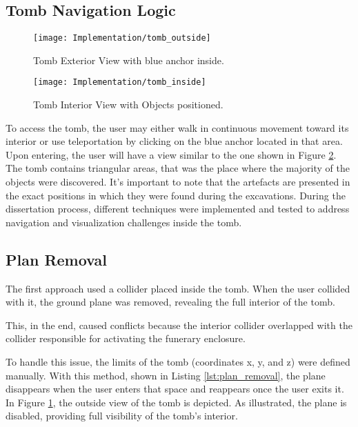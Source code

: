 \subsection{Tomb Navigation Logic}
\label{sec:tomb_logic}

 \begin{figure}[h!]
    \centering
    \texttt{[image: Implementation/tomb\_outside]}
    \caption{Tomb Exterior View with blue anchor inside.}
    \label{fig:tomb_outside}    
\end{figure}

 \begin{figure}[h!]
    \centering
    \texttt{[image: Implementation/tomb\_inside]}
    \caption{Tomb Interior View with Objects positioned.}
    \label{fig:tomb_inside}    
\end{figure}

To access the tomb, the user may either walk in continuous movement toward its interior or use teleportation by clicking on the blue anchor located in that area.
Upon entering, the user will have a view similar to the one shown in Figure \ref{fig:tomb_inside}.
The tomb contains triangular areas, that was the place where the majority of the objects were discovered. 
It's important to note that the artefacts are presented in the exact positions in which they were found during the excavations.
During the dissertation process, different techniques were implemented and tested to address navigation and visualization challenges inside the tomb.

\subsection*{Plan Removal}

The first approach used a collider placed inside the tomb. When the user collided with it, the ground plane was removed, revealing the full interior of the tomb.

This, in the end, caused conflicts because the interior collider overlapped with the collider responsible for activating the funerary enclosure.

To handle this issue, the limits of the tomb (coordinates x, y, and z) were defined manually. With this method, shown in Listing \ref{lst:plan_removal}, the plane disappears when the user enters that space and reappears once the user exits it.
In Figure \ref{fig:tomb_outside}, the outside view of the tomb is depicted. As illustrated, the plane is disabled, providing full visibility of the tomb’s interior.


